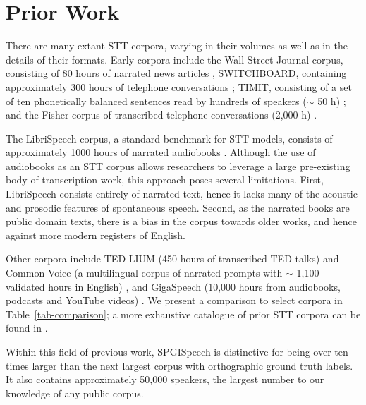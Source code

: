 \documentclass{article}
\newcommand\tabref{Table~\ref}
\begin{document}
\section{Prior Work}
There are many extant STT corpora, varying in their volumes as well as in the details of their formats.
Early corpora include the Wall Street Journal corpus,
consisting of 80 hours of narrated news articles \cite{baker92},
SWITCHBOARD, containing approximately 300 hours of telephone conversations \cite{godfrey92}; TIMIT, consisting of a set of ten
phonetically balanced sentences read by hundreds of speakers ($\sim$
50 h) \cite{garofolo93}; and the Fisher corpus of transcribed
telephone conversations (2,000 h) \cite{cieri04}. 

The LibriSpeech corpus, a standard benchmark for STT models,
consists of approximately 1000 hours of narrated audiobooks
\cite{panayotov15}.  Although the use of audiobooks as an STT
corpus allows researchers to leverage a large pre-existing body of transcription work,
this approach poses several limitations.  First, LibriSpeech
consists entirely of narrated text, hence it lacks many of the
acoustic and prosodic features of spontaneous speech.  Second, as the
narrated books are public domain texts, there is a bias in the corpus
towards older works, and hence against more modern registers of
English.  

Other corpora include
TED-LIUM (450 hours of transcribed TED talks) \cite{hernandez18} and 
Common Voice (a multilingual corpus of narrated prompts with $\sim$ 1,100 validated
hours in English) \cite{ardila19}, and GigaSpeech (10,000 hours from audiobooks, podcasts and YouTube videos) \cite{chen21}.
We present a comparison to select corpora in \tabref{tab-comparison}; a more exhaustive
catalogue of prior STT corpora can be found in \cite{leroux14}.

Within this field of previous work, SPGISpeech is distinctive for being over ten times larger than the next largest corpus with orthographic ground truth labels.  It
also contains approximately 50,000 speakers, the largest number to our knowledge of any public corpus.
\end{document}
